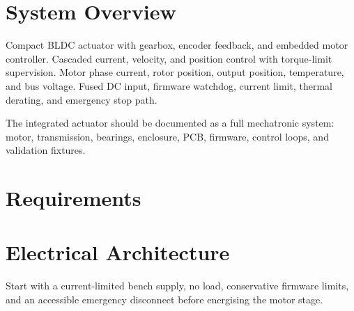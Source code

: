 \documentclass[confidential]{../../classes/nervtech-engdoc}
\begin{document}
\maketitle
\tableofcontents
\newpage

\begin{revisionhistory}
\end{revisionhistory}

\section{System Overview}
\systemsummary
  {Compact BLDC actuator with gearbox, encoder feedback, and embedded motor controller.}
  {Cascaded current, velocity, and position control with torque-limit supervision.}
  {Motor phase current, rotor position, output position, temperature, and bus voltage.}
  {Fused DC input, firmware watchdog, current limit, thermal derating, and emergency stop path.}

\begin{designnote}
The integrated actuator should be documented as a full mechatronic system: motor, transmission, bearings, enclosure, PCB, firmware, control loops, and validation fixtures.
\end{designnote}

\section{Requirements}
\begin{requirementstable}
\end{requirementstable}

\section{Electrical Architecture}
\begin{safetynote}
Start with a current-limited bench supply, no load, conservative firmware limits, and an accessible emergency disconnect before energising the motor stage.
\end{safetynote}
\end{document}

